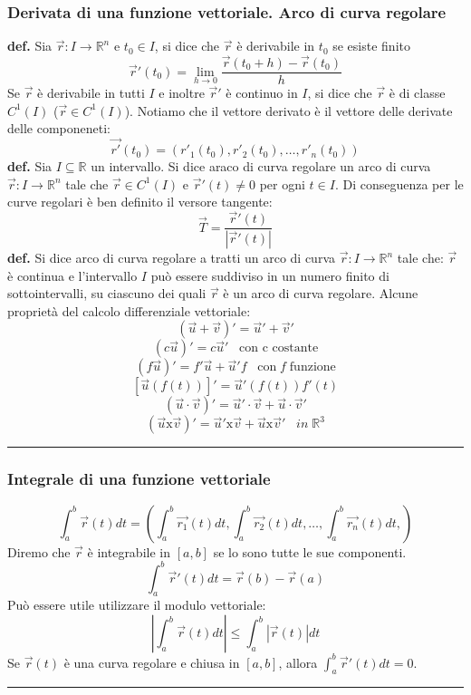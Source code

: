 \subsubsection*{Derivata di una funzione vettoriale. Arco di curva regolare}
\textbf{def.} Sia $\vec{r}: I \rightarrow \mathbb{R}^n$ e $t_0 \in I$, si dice che $\vec{r}$ è derivabile in $t_0$ se esiste finito
\[
    \vec{r}'(t_0) = \lim_{h\rightarrow 0}\frac{\vec{r}(t_0 +h) - \vec{r}(t_0)}{h}
\]
Se $\vec{r}$ è derivabile in tutti $I$ e inoltre $\vec{r}'$ è continuo in $I$, si dice che $\vec{r}$ è di classe $C^1(I)$ ($\vec{r}\in C^1(I)$).\newline
Notiamo che il vettore derivato è il vettore delle derivate delle componeneti:
\[
    \vec{r'}(t_0) = (r'_1(t_0), r'_2(t_0), \dots, r'_n(t_0))
\]
\textbf{def.} Sia $I \subseteq \mathbb{R}$ un intervallo. Si dice araco di curva regolare un arco di curva $\vec{r}: I \rightarrow  \mathbb{R}^n$ tale che $\vec{r} \in C^1(I)$ e $\vec{r}'(t) \neq 0$ per ogni $t \in I$.\newline
Di conseguenza per le curve regolari è ben definito il versore tangente:
\[
    \vec{T} = \frac{\vec{r}'(t)}{|\vec{r}'(t)|}
\]
\textbf{def.} Si dice arco di curva regolare a tratti un arco di curva $\vec{r} : I \rightarrow \mathbb{R}^n$ tale che: $\vec{r}$ è continua e l'intervallo $I$ può essere suddiviso in un numero finito di sottointervalli, su ciascuno dei quali $\vec{r}$ è un arco di curva regolare.\newline
\newline
Alcune proprietà del calcolo differenziale vettoriale:
\[
    (\vec{u} + \vec{v})' = \vec{u}' + \vec{v}'
\]
\[
    (c \vec{u})' = c \vec{u}' \;\;\; \text{con c costante}
\]
\[
    (f \vec{u})' = f' \vec{u} + \vec{u}' f \;\;\;\text{con} \; f \; \text{funzione}
\]
\[
    [\vec{u}(f(t))]' = \vec{u}'(f(t))f'(t)
\]
\[
    (\vec{u} \cdot \vec{v})' = \vec{u}' \cdot  \vec{v} + \vec{u} \cdot  \vec{v}'
\]
\[
    (\vec{u} \text{x} \vec{v})' = \vec{u}' \text{x} \vec{v} + \vec{u} \text{x} \vec{v}' \;\;\; in \;\mathbb{R}^3
\]
\rule{\textwidth}{0,4pt}
\subsubsection*{Integrale di una funzione vettoriale}
\[
    \int_{a}^{b} \vec{r}(t) dt =\left( \int_{a}^{b}\vec{r_1}(t) dt,\int_{a}^{b}\vec{r_2}(t) dt, \dots, \int_{a}^{b}\vec{r_n}(t) dt,\right)
\]
Diremo che $\vec{r}$ è integrabile in $[a,b]$ se lo sono tutte le sue componenti.\newline
\[
    \int_{a}^{b} \vec{r}'(t) dt = \vec{r}(b) - \vec{r}(a)
\]
Può essere utile utilizzare il modulo vettoriale:
\[
    \left| \int_{a}^{b}\vec{r}(t)dt \right| \leq \int_{a}^{b}|\vec{r}(t)|dt
\]
Se $\vec{r}(t)$ è una curva regolare e chiusa in $[a,b]$, allora $\int_{a}^{b}\vec{r}'(t) dt =0$.\newline
\rule{\textwidth}{0,4pt}

